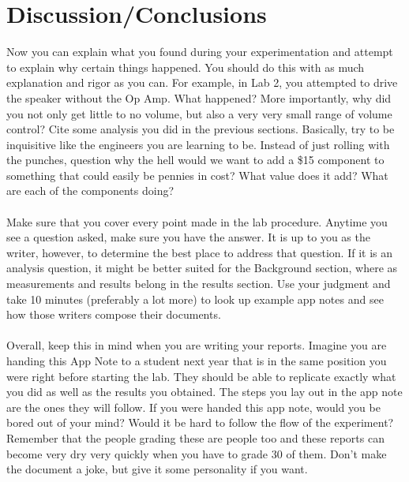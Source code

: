 \documentclass{hitec}
\begin{document}
\section{Discussion/Conclusions}
Now you can explain what you found during your experimentation and attempt to explain why certain things happened. You should do this with as much explanation and rigor as you can. For example, in Lab 2, you attempted to drive the speaker without the Op Amp. What happened? More importantly, why did you not only get little to no volume, but also a very very small range of volume control? Cite some analysis you did in the previous sections. Basically, try to be inquisitive like the engineers you are learning to be. Instead of just rolling with the punches, question why the hell would we want to add a \$15 component to something that could easily be pennies in cost? What value does it add? What are each of the components doing?
\\
\\
\noindent
Make sure that you cover every point made in the lab procedure. Anytime you see a question asked, make sure you have the answer. It is up to you as the writer, however, to determine the best place to address that question. If it is an analysis question, it might be better suited for the Background section, where as measurements and results belong in the results section. Use your judgment and take 10 minutes (preferably a lot more) to look up example app notes and see how those writers compose their documents.
\\
\\
\noindent
Overall, keep this in mind when you are writing your reports. Imagine you are handing this App Note to a student next year that is in the same position you were right before starting the lab. They should be able to replicate exactly what you did as well as the results you obtained. The steps you lay out in the app note are the ones they will follow. If you were handed this app note, would you be bored out of your mind? Would it be hard to follow the flow of the experiment? Remember that the people grading these are people too and these reports can become very dry very quickly when you have to grade 30 of them. Don't make the document a joke, but give it some personality if you want.
\end{document}

